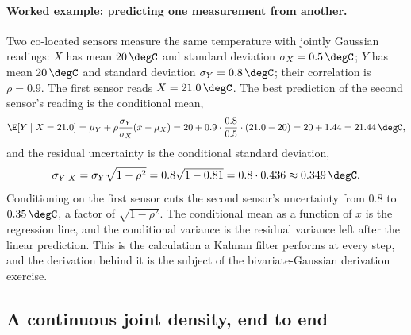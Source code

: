 \paragraph{Worked example: predicting one measurement from another.}
Two co-located sensors measure the same temperature with jointly
Gaussian readings: $X$ has mean $20\,\degC$ and standard deviation
$\sigma_{X} = 0.5\,\degC$; $Y$ has mean $20\,\degC$ and standard
deviation $\sigma_{Y} = 0.8\,\degC$; their correlation is
$\rho = 0.9$. The first sensor reads $X = 21.0\,\degC$. The best
prediction of the second sensor's reading is the conditional mean,
\[
\E[Y \mid X = 21.0] = \mu_{Y} + \rho \frac{\sigma_{Y}}{\sigma_{X}}
(x - \mu_{X}) = 20 + 0.9 \cdot \frac{0.8}{0.5} \cdot (21.0 - 20)
= 20 + 1.44 = 21.44\,\degC,
\]
and the residual uncertainty is the conditional standard deviation,
\[
\sigma_{Y \mid X} = \sigma_{Y}\sqrt{1 - \rho^{2}}
= 0.8 \sqrt{1 - 0.81} = 0.8 \cdot 0.436 \approx 0.349\,\degC.
\]
Conditioning on the first sensor cuts the second sensor's
uncertainty from $0.8$ to $0.35\,\degC$, a factor of
$\sqrt{1 - \rho^{2}}$. The conditional mean as a function of $x$ is
the regression line, and the conditional variance is the residual
variance left after the linear prediction. This is the calculation a
Kalman filter performs at every step, and the derivation behind it
is the subject of the bivariate-Gaussian derivation exercise.

\subsection{A continuous joint density, end to end}

